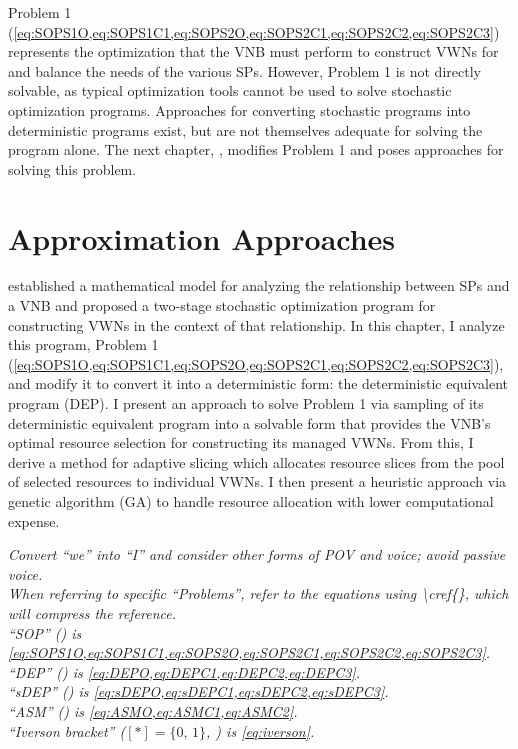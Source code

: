 \documentclass[12pt,dvipsnames]{report}
\begin{document}

Problem 1 (\cref{eq:SOPS1O,eq:SOPS1C1,eq:SOPS2O,eq:SOPS2C1,eq:SOPS2C2,eq:SOPS2C3}) represents the optimization that the VNB must perform to construct VWNs for and balance the needs of the various SPs.  However, Problem 1 is not directly solvable, as typical optimization tools cannot be used to solve stochastic optimization programs.  Approaches for converting stochastic programs into deterministic programs exist, but are not themselves adequate for solving the program alone.  The next chapter, , modifies Problem 1 and poses approaches for solving this problem.

\iftrue
\pagebreak
\chapter{Approximation Approaches} \label{ch:approaches}

 established a mathematical model for analyzing the relationship between SPs and a VNB and proposed a two-stage stochastic optimization program for constructing VWNs in the context of that relationship.  In this chapter, I analyze this program, Problem 1 (\cref{eq:SOPS1O,eq:SOPS1C1,eq:SOPS2O,eq:SOPS2C1,eq:SOPS2C2,eq:SOPS2C3}), and modify it to convert it into a deterministic form: the deterministic equivalent program (DEP).  I present an approach to solve Problem 1 via sampling of its deterministic equivalent program into a solvable form that provides the VNB's optimal resource selection for constructing its managed VWNs.  From this, I derive a method for adaptive slicing which allocates resource slices from the pool of selected resources to individual VWNs.  I then present a heuristic approach via genetic algorithm (GA) to handle resource allocation with lower computational expense.

%
\textit{Convert ``we'' into ``I'' and consider other forms of POV and voice; avoid passive voice.\\When referring to specific ``Problems'', refer to the equations using \textbackslash cref\{\}, which will compress the reference.\\``SOP'' () is \cref{eq:SOPS1O,eq:SOPS1C1,eq:SOPS2O,eq:SOPS2C1,eq:SOPS2C2,eq:SOPS2C3}.\\``DEP'' () is \cref{eq:DEPO,eq:DEPC1,eq:DEPC2,eq:DEPC3}.\\``sDEP'' () is \cref{eq:sDEPO,eq:sDEPC1,eq:sDEPC2,eq:sDEPC3}.\\``ASM'' () is \cref{eq:ASMO,eq:ASMC1,eq:ASMC2}.\\``Iverson bracket'' ($[*]=\{0,\, 1\}$, ) is \cref{eq:iverson}.}
\end{document}
